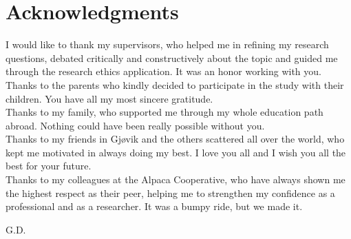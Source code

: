 \chapter*{Acknowledgments}
I would like to thank my supervisors, who helped me in refining my research questions, debated critically and constructively about the topic and guided me through the research ethics application. It was an honor working with you.\\
Thanks to the parents who kindly decided to participate in the study with their children. You have all my most sincere gratitude.\\
Thanks to my family, who supported me through my whole education path abroad. Nothing could have been really possible without you.\\
Thanks to my friends in Gjøvik and the others scattered all over the world, who kept me motivated in always doing my best. I love you all and I wish you all the best for your future.\\
Thanks to my colleagues at the Alpaca Cooperative, who have always shown me the highest respect as their peer, helping me to strengthen my confidence as a professional and as a researcher. It was a bumpy ride, but we made it.
\begin{flushright}
G.D.\\
\end{flushright}

\hypersetup{pageanchor=false}